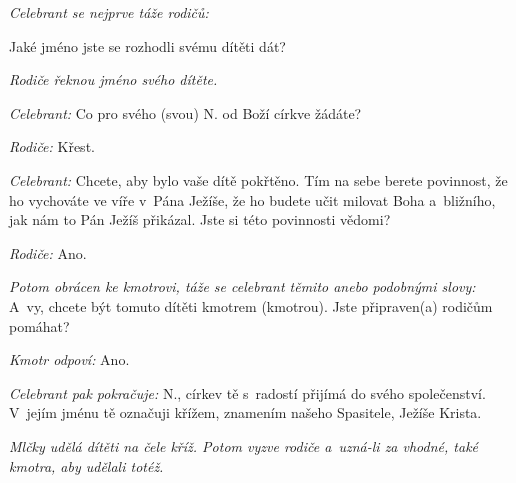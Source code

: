 \textit{Celebrant se nejprve táže rodičů:}

Jaké jméno jste se rozhodli svému dítěti dát?

\textit{Rodiče řeknou jméno svého dítěte.}

\textit{Celebrant:} Co pro svého (svou) {\color{red}N.} od Boží církve žádáte?

\textit{Rodiče:} Křest. 	

\textit{Celebrant:} Chcete, aby bylo vaše dítě pokřtěno. Tím na sebe berete
povinnost, že ho vychováte ve víře v~Pána Ježíše, že ho budete učit milovat
Boha a~bližního, jak nám to Pán Ježíš přikázal. Jste si této povinnosti
vědomi?

\textit{Rodiče:} Ano.

\textit{Potom obrácen ke kmotrovi, táže se celebrant těmito anebo podobnými
slovy:} A~vy, chcete být tomuto dítěti kmotrem (kmotrou). Jste připraven(a)
rodičům pomáhat?

\textit{Kmotr odpoví:} Ano.

\textit{Celebrant pak pokračuje:} {\color{red}N.}, církev tě s~radostí přijímá do svého
společenství. V~jejím jménu tě označuji křížem, znamením našeho Spasitele,
Ježíše Krista.

\textit{Mlčky udělá dítěti na čele kříž. Potom vyzve rodiče a~uzná-li
za vhodné, také kmotra, aby udělali totéž.}
